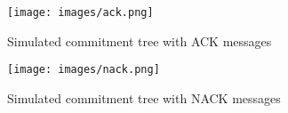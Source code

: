 
\begin{figure}[t]
	\centering
		\texttt{[image: images/ack.png]}\\
		\caption{Simulated commitment tree with ACK messages}
	\label{fig:figure1}
\end{figure}

\begin{figure}[t]
	\centering
		\texttt{[image: images/nack.png]}\\
		\caption[Simulated commitment tree with NACK messages]{Simulated commitment tree with NACK messages}
	\label{fig:figure1}
\end{figure}

